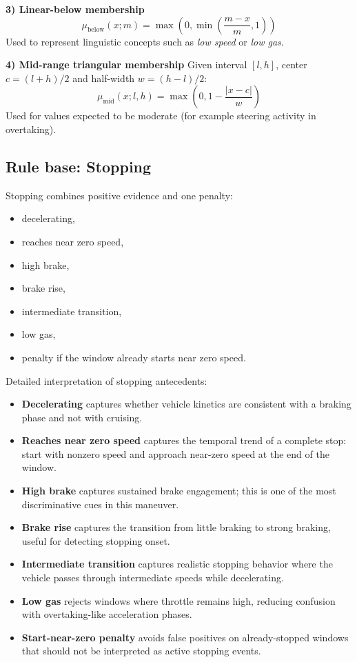 \documentclass[11pt,a4paper]{article}
\begin{document}
\textbf{3) Linear-below membership}
\[
\mu_{\text{below}}(x; m)=\max\left(0,\min\left(\frac{m-x}{m},1\right)\right)
\]
Used to represent linguistic concepts such as \emph{low speed} or \emph{low gas}.

\textbf{4) Mid-range triangular membership}
Given interval $[l,h]$, center $c=(l+h)/2$ and half-width $w=(h-l)/2$:
\[
\mu_{\text{mid}}(x;l,h)=\max\left(0, 1-\frac{|x-c|}{w}\right)
\]
Used for values expected to be moderate (for example steering activity in overtaking).

\subsection{Rule base: Stopping}
Stopping combines positive evidence and one penalty:
\begin{itemize}
    \item decelerating,
    \item reaches near zero speed,
    \item high brake,
    \item brake rise,
    \item intermediate transition,
    \item low gas,
    \item penalty if the window already starts near zero speed.
\end{itemize}

Detailed interpretation of stopping antecedents:
\begin{itemize}
    \item \textbf{Decelerating} captures whether vehicle kinetics are consistent with a braking phase and not with cruising.
    \item \textbf{Reaches near zero speed} captures the temporal trend of a complete stop: start with nonzero speed and approach near-zero speed at the end of the window.
    \item \textbf{High brake} captures sustained brake engagement; this is one of the most discriminative cues in this maneuver.
    \item \textbf{Brake rise} captures the transition from little braking to strong braking, useful for detecting stopping onset.
    \item \textbf{Intermediate transition} captures realistic stopping behavior where the vehicle passes through intermediate speeds while decelerating.
    \item \textbf{Low gas} rejects windows where throttle remains high, reducing confusion with overtaking-like acceleration phases.
    \item \textbf{Start-near-zero penalty} avoids false positives on already-stopped windows that should not be interpreted as active stopping events.
\end{itemize}
\end{document}
